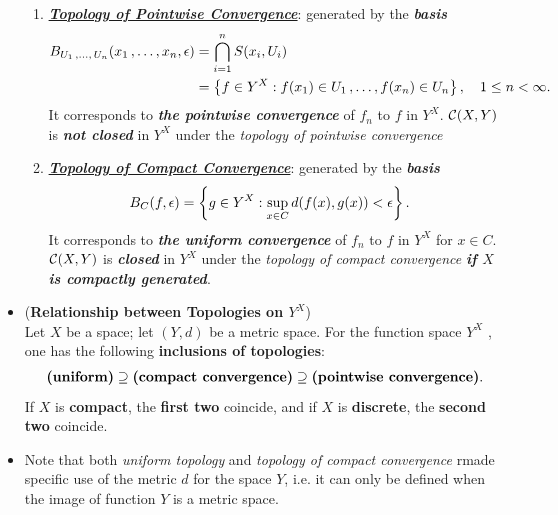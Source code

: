\documentclass[11pt]{article}
\begin{document}
\begin{itemize}
\begin{remark}
\begin{enumerate}
\item  \underline{\emph{\textbf{Topology of Pointwise Convergence}}}: generated by the \emph{\textbf{basis}}
\begin{align*}
B_{U_1 \,{,}\ldots{,}\, U_n}(x_1 \,{,}\ldots{,}\, x_n, \epsilon)  &= \bigcap_{i=1}^{n}S(x_i, U_i) \\
&= \left\{f \in Y^X: f(x_1) \in U_1 \,{,}\ldots{,}\, f(x_n) \in U_n\right\}, \quad   1 \le n < \infty.
\end{align*} It corresponds to \emph{\textbf{the pointwise convergence}} of $f_n$ to $f$ in $Y^X$. ${\mathcal C}(X, Y)$ is \emph{\textbf{not closed}} in $Y^X$ under the \emph{topology of pointwise convergence}

\item \underline{\emph{\textbf{Topology of Compact Convergence}}}: generated by the \emph{\textbf{basis}}
\begin{align*}
B_{C}(f, \epsilon) &= \left\{g \in Y^X: \sup_{x \in C}d(f (x), g(x)) < \epsilon \right\}.
\end{align*} It corresponds to \emph{\textbf{the uniform convergence}} of $f_n$ to $f$ in $Y^X$ for $x \in C$. ${\mathcal C}(X, Y)$ is \emph{\textbf{closed}} in $Y^X$ under the \emph{topology of compact convergence} \emph{\textbf{if $X$ is compactly generated}}.
\end{enumerate}
\end{remark}

\item \begin{theorem} (\textbf{Relationship between Topologies on $Y^X$}) \citep{munkres2000topology}\\
Let $X$ be a space; let $(Y, d)$ be a metric space. For the function space $Y^X$ , one has the following \textbf{inclusions of topologies}:
\begin{align*}
\text{\textbf{(uniform)}} \supseteq \text{\textbf{(compact convergence)}} \supseteq \text{\textbf{(pointwise convergence)}}.
\end{align*}
If $X$ is \textbf{compact}, the \textbf{first two} coincide, and if $X$ is \textbf{discrete}, the \textbf{second two} coincide.
\end{theorem}

\item \begin{remark}
Note that both \emph{uniform topology} and \emph{topology of compact convergence} rmade specific use of the metric $d$ for the space $Y$, i.e. it can only be defined when the image of function $Y$  is a metric space.


\end{remark}
\end{itemize}
\end{document}
